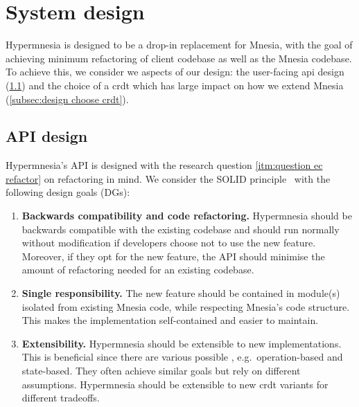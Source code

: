 \section{System design} \label{sec:design}

Hypermnesia is designed to be a drop-in replacement for Mnesia, with the goal
of achieving minimum refactoring of client codebase as well as the Mnesia codebase.
To achieve this, we consider we aspects of our design: the user-facing 
\acrshort{api} design (\cref{subsec:design api}) and the choice of a 
\acrshort{crdt} which
has large impact on how we extend Mnesia (\cref{subsec:design choose crdt}).




\subsection{API design} \label{subsec:design api}

Hypermnesia's API is designed with the research question \cref{itm:question ec refactor}
on refactoring in mind. We consider the SOLID principle~\cite{martin2000solid}
with the following design goals (DGs):

\begin{enumerate}[label={DG\arabic*.},ref={DG\arabic*}]
  \item \textbf{Backwards compatibility and code refactoring.} Hypermnesia should be
  backwards compatible with the existing codebase and should run normally without
  modification if developers choose not to use the new feature. Moreover, if they opt
  for the new feature, the API should minimise the amount of refactoring 
  needed for an existing codebase. \label{itm:refactor}
  \item \textbf{Single responsibility.} The new feature should be contained in 
  module(s) isolated from existing Mnesia code, while respecting Mnesia's code structure.
  This makes the implementation self-contained and easier to maintain. \label{itm:single resp}
  \item \textbf{Extensibility.} Hypermnesia should be extensible to new 
  implementations. This is beneficial since there are various possible , 
  e.g.\ operation-based and state-based. They often achieve similar goals but rely 
  on different assumptions. Hypermnesia should be extensible to new \acrshort{crdt} 
  variants for different tradeoffs.
  \label{itm:extensible}
\end{enumerate}


